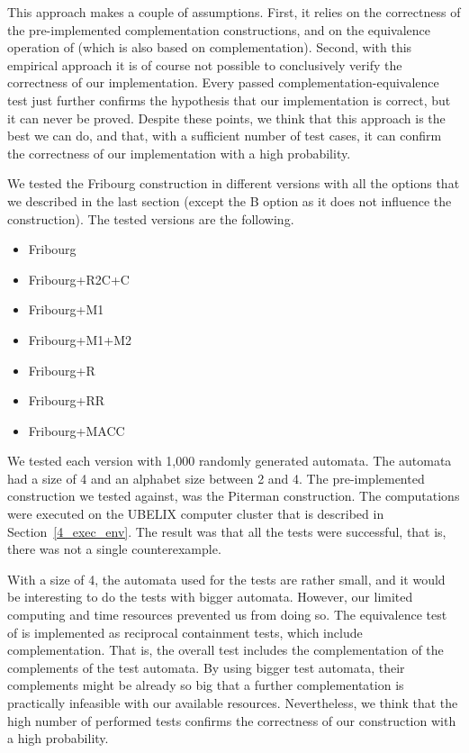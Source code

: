 This approach makes a couple of assumptions. First, it relies on the correctness of the pre-implemented complementation constructions, and on the equivalence operation of \goal{} (which is also based on complementation). Second, with this empirical approach it is of course not possible to conclusively verify the correctness of our implementation. Every passed complementation-equivalence test just further confirms the hypothesis that our implementation is correct, but it can never be proved. Despite these points, we think that this approach is the best we can do, and that, with a sufficient number of test cases, it can confirm the correctness of our implementation with a high probability.

We tested the Fribourg construction in different versions with all the options that we described in the last section (except the B option as it does not influence the construction). The tested versions are the following.
\begin{itemize}
\item Fribourg
\item Fribourg+R2C+C
\item Fribourg+M1
\item Fribourg+M1+M2
\item Fribourg+R
\item Fribourg+RR
\item Fribourg+MACC
\end{itemize}

We tested each version with 1,000 randomly generated automata. The automata had a size of 4 and an alphabet size between 2 and 4. The pre-implemented construction we tested against, was the Piterman construction. The computations were executed on the UBELIX computer cluster that is described in Section~\ref{4_exec_env}. The result was that all the tests were successful, that is, there was not a single counterexample.

With a size of 4, the automata used for the tests are rather small, and it would be interesting to do the tests with bigger automata. However, our limited computing and time resources prevented us from doing so. The equivalence test of \goal{} is implemented as reciprocal containment tests, which include complementation. That is, the overall test includes the complementation of the complements of the test automata. By using bigger test automata, their complements might be already so big that a further complementation is practically infeasible with our available resources. Nevertheless, we think that the high number of performed tests confirms the correctness of our construction with a high probability.


